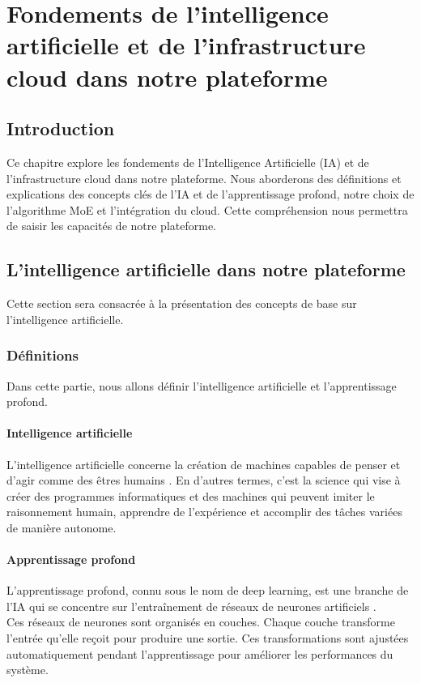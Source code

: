 \vfill 
\chapter{Fondements de l'intelligence artificielle et de l'infrastructure cloud dans notre plateforme}
\label{chap:fondements de l'Intelligence Artificielle et de l'Infrastructure Cloud dans notre Plateforme}
\mtcaddchapter
\section*{Introduction}
\justifying
Ce chapitre explore les fondements de l'Intelligence Artificielle (IA) et de l'infrastructure cloud dans notre plateforme. Nous aborderons des définitions et explications des concepts clés de l’IA et de l’apprentissage profond, notre choix de l'algorithme MoE et l'intégration du cloud. Cette compréhension nous permettra de saisir les capacités de notre plateforme.

\section{L'intelligence artificielle dans notre plateforme}
\justifying
Cette section sera consacrée à la présentation des concepts de base sur 
l’intelligence artificielle.
\subsection{Définitions}
\justifying
Dans cette partie, nous allons définir l'intelligence artificielle et l'apprentissage profond.


\subsubsection{Intelligence artificielle}
\justifying
L'intelligence artificielle concerne la création de machines capables de penser et d'agir comme des êtres humains \cite{ai}. En d'autres termes, c'est la science qui vise à créer des programmes informatiques et des machines qui peuvent imiter le raisonnement humain, apprendre de l'expérience et accomplir des tâches variées de manière autonome.

\subsubsection{Apprentissage profond}
\justifying
L'apprentissage profond, connu sous le nom de deep learning, est une branche de l’IA qui se concentre sur l'entraînement de réseaux de neurones artificiels \cite{deepLearning}.\\
Ces réseaux de neurones sont organisés en couches. Chaque couche transforme l'entrée qu'elle reçoit pour produire une sortie. Ces transformations sont ajustées automatiquement pendant l'apprentissage pour améliorer les performances du système.


